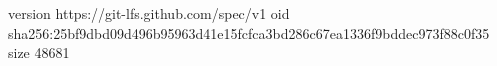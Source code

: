 version https://git-lfs.github.com/spec/v1
oid sha256:25bf9dbd09d496b95963d41e15fcfca3bd286c67ea1336f9bddec973f88c0f35
size 48681
